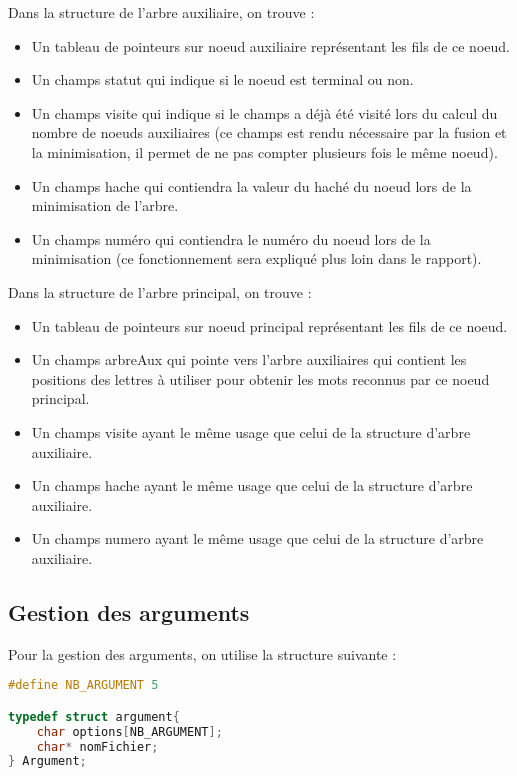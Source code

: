 \documentclass[15pt, a4paper]{article}
\begin{document}
\bigskip

\noindent Dans la structure de l'arbre auxiliaire, on trouve : 

\begin{itemize}
\item Un tableau de pointeurs sur noeud auxiliaire représentant les fils de ce noeud.
\item Un champs statut qui indique si le noeud est terminal ou non.
\item Un champs visite qui indique si le champs a déjà été visité lors du calcul du nombre de noeuds 
  auxiliaires (ce champs est rendu nécessaire par la fusion et la minimisation, il permet de ne pas 
  compter plusieurs fois le même noeud).
\item Un champs hache qui contiendra la valeur du haché du noeud lors de la minimisation de l'arbre.
\item Un champs numéro qui contiendra le numéro du noeud lors de la minimisation (ce fonctionnement sera
  expliqué plus loin dans le rapport).
\end{itemize}

\bigskip

\noindent Dans la structure de l'arbre principal, on trouve :

\begin{itemize}
\item Un tableau de pointeurs sur noeud principal représentant les fils de ce noeud.
\item Un champs arbreAux qui pointe vers l'arbre auxiliaires qui contient les positions
  des lettres à utiliser pour obtenir les mots reconnus par ce noeud principal.
\item Un champs visite ayant le même usage que celui de la structure d'arbre auxiliaire.
\item Un champs hache ayant le même usage que celui de la structure d'arbre auxiliaire.
\item Un champs numero ayant le même usage que celui de la structure d'arbre auxiliaire.
\end{itemize}

\subsection{Gestion des arguments}

\noindent Pour la gestion des arguments, on utilise la structure suivante :

\begin{lstlisting}[language=c]
#define NB_ARGUMENT 5

typedef struct argument{
    char options[NB_ARGUMENT]; 
    char* nomFichier;
} Argument;
\end{lstlisting}
\end{document}
